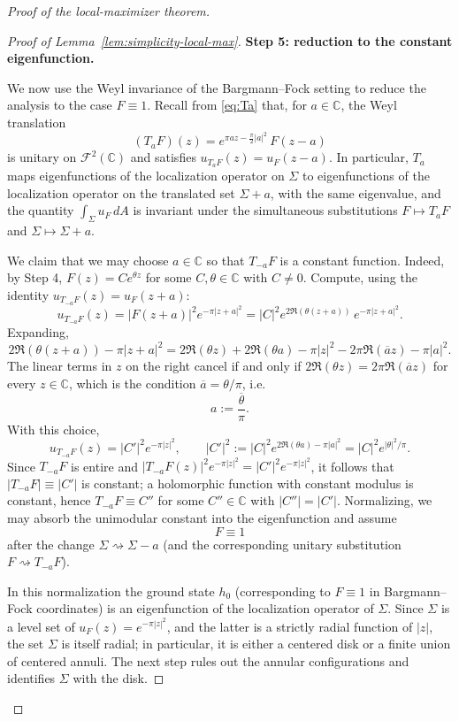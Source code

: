 \documentclass[a4paper,11pt,reqno]{amsart}
\numberwithin{equation}{section}
\theoremstyle{plain} %
\theoremstyle{definition} %
\theoremstyle{remark}
\newcommand{\C}{\mathbb{C}}
\begin{document}
\begin{proof}[Proof of the local-maximizer theorem]
\begin{proof}[Proof of Lemma~\ref{lem:simplicity-local-max}]
\medskip
\noindent
{\bf Step 5: reduction to the constant eigenfunction.}

We now use the Weyl invariance of the Bargmann--Fock setting to reduce the
analysis to the case \(F\equiv 1\). Recall from \eqref{eq:Ta} that, for
\(a\in\C\), the Weyl translation
\[
(T_a F)(z)= e^{\pi a z-\frac{\pi}{2}|a|^2}\,F(z-a)
\]
is unitary on \(\mathcal F^2(\C)\) and satisfies
\(u_{T_aF}(z)=u_F(z-a)\). In particular, \(T_a\) maps eigenfunctions of the
localization operator on \(\Sigma\) to eigenfunctions of the localization
operator on the translated set \(\Sigma+a\), with the same eigenvalue, and the
quantity \(\int_\Sigma u_F\,dA\) is invariant under the simultaneous
substitutions \(F\mapsto T_aF\) and \(\Sigma\mapsto \Sigma+a\).

We claim that we may choose \(a\in\C\) so that \(T_{-a}F\) is a constant
function. Indeed, by Step 4, \(F(z)=Ce^{\theta z}\) for some \(C,\theta\in\C\)
with \(C\ne 0\). Compute, using the identity
\(u_{T_{-a}F}(z)=u_F(z+a)\):
\[
u_{T_{-a}F}(z)=|F(z+a)|^2 e^{-\pi|z+a|^2}
=|C|^2 e^{2\Re(\theta(z+a))}\,e^{-\pi|z+a|^2}.
\]
Expanding,
\[
2\Re(\theta(z+a))-\pi|z+a|^2
=
2\Re(\theta z)+2\Re(\theta a)-\pi|z|^2-2\pi\Re(\overline a z)-\pi|a|^2.
\]
The linear terms in \(z\) on the right cancel if and only if
\(2\Re(\theta z)=2\pi\Re(\overline a z)\) for every \(z\in\C\), which is the
condition \(\overline a=\theta/\pi\), i.e.
\[
a:=\frac{\overline\theta}{\pi}.
\]
With this choice,
\[
u_{T_{-a}F}(z)=|C'|^2 e^{-\pi|z|^2},
\qquad
|C'|^2:=|C|^2 e^{2\Re(\theta a)-\pi|a|^2}=|C|^2 e^{|\theta|^2/\pi}.
\]
Since \(T_{-a}F\) is entire and \(|T_{-a}F(z)|^2 e^{-\pi|z|^2}=|C'|^2
e^{-\pi|z|^2}\), it follows that \(|T_{-a}F|\equiv|C'|\) is constant; a
holomorphic function with constant modulus is constant, hence
\(T_{-a}F\equiv C''\) for some \(C''\in\C\) with \(|C''|=|C'|\). Normalizing,
we may absorb the unimodular constant into the eigenfunction and assume
\[
F\equiv 1
\]
after the change \(\Sigma\rightsquigarrow \Sigma-a\) (and the corresponding
unitary substitution \(F\rightsquigarrow T_{-a}F\)).

In this normalization the ground state \(h_0\) (corresponding to
\(F\equiv 1\) in Bargmann--Fock coordinates) is an eigenfunction of the
localization operator of \(\Sigma\). Since \(\Sigma\) is a level set of
\(u_F(z) = e^{-\pi |z|^2}\), and the latter is a strictly radial function of
\(|z|\), the set \(\Sigma\) is itself radial; in particular, it is either a
centered disk or a finite union of centered annuli. The next step rules out
the annular configurations and identifies \(\Sigma\) with the disk.


\end{proof}
\end{proof}
\end{document}
